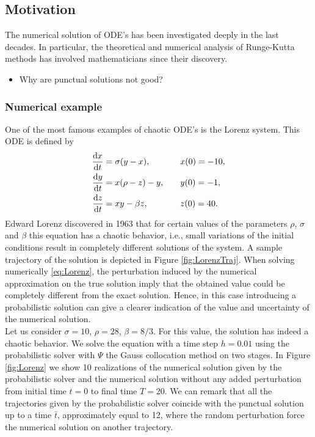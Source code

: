 \subsection{Motivation}

The numerical solution of ODE's has been investigated deeply in the last decades. In particular, the theoretical and numerical analysis of Runge-Kutta methods has involved mathematicians since their discovery.
\begin{itemize}
	\item Why are punctual solutions not good?
\end{itemize}

\subsubsection{Numerical example}

One of the most famous examples of chaotic ODE's is the Lorenz system. This ODE is defined by
\begin{equation}\label{eq:Lorenz}
\begin{aligned}
\dv{x}{t} &= \sigma(y - x), \quad &&x(0) = -10,\\
\dv{y}{t} &= x(\rho - z) - y, \quad &&y(0) = -1,\\
\dv{z}{t} &= xy - \beta z, \quad &&z(0) = 40.
\end{aligned}
\end{equation}
Edward Lorenz discovered in 1963 that for certain values of the parameters $\rho$, $\sigma$ and $\beta$ this equation has a chaotic behavior, i.e., small variations of the initial conditions result in completely different solutions of the system. A sample trajectory of the solution is depicted in Figure \ref{fig:LorenzTraj}. When solving numerically \eqref{eq:Lorenz}, the perturbation induced by the numerical approximation on the true solution imply that the obtained value could be completely different from the exact solution. Hence, in this case introducing a probabilistic solution can give a clearer indication of the value and uncertainty of the numerical solution. \\
Let us consider $\sigma = 10$, $\rho = 28$, $\beta = 8/3$. For this value, the solution has indeed a chaotic behavior. We solve the equation with a time step $h = 0.01$ using the probabilistic solver with $\Psi$ the Gauss collocation method on two stages. In Figure \ref{fig:Lorenz} we show 10 realizations of the numerical solution given by the probabilistic solver and the numerical solution without any added perturbation from initial time $t = 0$ to final time $T = 20$. We can remark that all the trajectories given by the probabilistic solver coincide with the punctual solution up to a time $\bar t$, approximately equal to 12, where the random perturbation force the numerical solution on another trajectory. 

